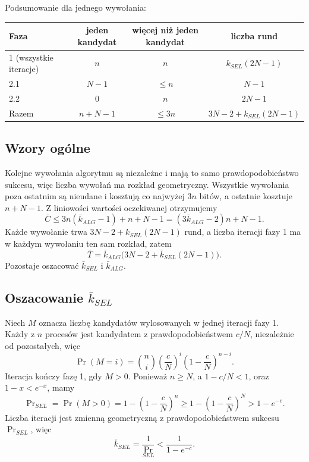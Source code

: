 \documentclass[11pt,a4paper]{article}
\begin{document}
Podsumowanie dla jednego wywołania:
\begin{center}
    \renewcommand{\arraystretch}{1.3}
    \begin{tabular}{lccc}
        \hline
        Faza & jeden kandydat & więcej niż jeden kandydat & liczba rund \\
        \hline
        1 (wszystkie iteracje) & $n$         & $n$        & $k_{SEL}(2N-1)$ \\
        2.1                    & $N-1$       & $\leq n$   & $N-1$ \\
        2.2                    & $0$         & $n$        & $2N-1$ \\
        \hline
        Razem                  & $n + N - 1$ & $\leq 3n$  & $3N-2+k_{SEL}(2N-1)$ \\
        \hline
    \end{tabular}
\end{center}

\subsection{Wzory ogólne}

Kolejne wywołania algorytmu są niezależne i mają to samo prawdopodobieństwo sukcesu, więc liczba wywołań ma rozkład geometryczny.
Wszystkie wywołania poza ostatnim są nieudane i kosztują co najwyżej $3n$ bitów, a ostatnie kosztuje $n+N-1$. Z liniowości wartości oczekiwanej otrzymujemy
\begin{equation}\label{eq:C}
    \bar{C} \leq 3n(\bar{k}_{ALG} - 1) + n + N - 1 = (3\bar{k}_{ALG} - 2)n + N - 1.
\end{equation}
Każde wywołanie trwa $3N-2+k_{SEL}(2N-1)$ rund, a liczba iteracji fazy 1 ma w każdym wywołaniu ten sam rozkład, zatem
\begin{equation}\label{eq:T}
    \bar{T} = \bar{k}_{ALG}\bigl(3N-2+\bar{k}_{SEL}(2N-1)\bigr).
\end{equation}
Pozostaje oszacować $\bar{k}_{SEL}$ i $\bar{k}_{ALG}$.

\subsection{Oszacowanie $\bar{k}_{SEL}$}

Niech $M$ oznacza liczbę kandydatów wylosowanych w jednej iteracji fazy 1. Każdy z $n$ procesów jest kandydatem z prawdopodobieństwem $c/N$, niezależnie od pozostałych, więc
\[
    \Pr(M = i) = \binom{n}{i}\left(\frac{c}{N}\right)^{i}\left(1-\frac{c}{N}\right)^{n-i}.
\]
Iteracja kończy fazę 1, gdy $M > 0$. Ponieważ $n \geq N$, a $1 - c/N < 1$, oraz $1 - x < e^{-x}$, mamy
\[
    \Pr\nolimits_{SEL} = \Pr(M>0) = 1 - \left(1-\frac{c}{N}\right)^{n} \geq 1 - \left(1-\frac{c}{N}\right)^{N} > 1 - e^{-c}.
\]
Liczba iteracji jest zmienną geometryczną z prawdopodobieństwem sukcesu $\Pr_{SEL}$, więc
\begin{equation}\label{eq:ksel}
    \bar{k}_{SEL} = \frac{1}{\Pr_{SEL}} < \frac{1}{1-e^{-c}}.
\end{equation}
\end{document}
